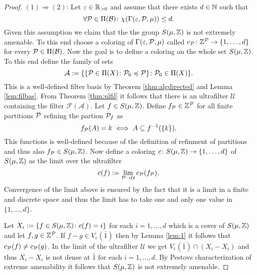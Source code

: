 \begin{proof}
  $(1) \Rightarrow (2)$: Let $\varepsilon \in \R_{>0}$ and assume that there exists $d \in \N$ such that
  \begin{equation*}
    \forall \P \in \Pi(\mathcal{B})\colon \chi(\Gamma(\varepsilon, {\P}, \mu)) \leq d. 
  \end{equation*}
  Given this assumption we claim that the the group $S(\mu, \Z)$ is not extremely amenable. To this end choose a coloring of $\Gamma(\varepsilon, \P, \mu)$ called $c_{\P}\colon \Z^{\P} \to \{1, \ldots, d\}$ for every $\P \in \Pi(\mathcal{B})$. Now the goal is to define a coloring on the whole set $S(\mu, \Z)$. To this end define the family of sets
  \begin{equation*}
    \mathcal{A} := \{\{ \P \in \Pi(X)\colon \P_0 \preccurlyeq \P\}\colon \P_0 \in \Pi(X)\}.
  \end{equation*}
  This is a well-defined filter basis by Theorem \ref{thm:algdirected} and Lemma \ref{lem:filbas}. From Theorem \ref{thm:ulfil} it follows that there is an ultrafilter $\mathcal{U}$ containing the filter $\mathcal{F}(\mathcal{A})$.
 Let $f \in S(\mu, \Z)$. Define $f_\P \in \Z^\P$ for all finite partitions $\P$ refining the partion $\P_f$ as
  \begin{equation*}
    f_\P(A) = k \iff A \subseteq f^{-1}(\{k\}). 
  \end{equation*}
  This functions is well-defined because of the definition of refinment of partitions and thus also $f_\P \in S(\mu, \Z)$.
  Now define a coloring $c\colon S(\mu, \Z) \to \{1, \ldots, d\}$ of $S(\mu, \Z)$ as the limit over the ultrafilter
  \begin{equation*}
    c(f) := \lim\limits_{\P \to \mathcal{U}} c_{\P}(f_\P).
  \end{equation*}
  Convergence of the limit above is ensured by the fact that it is a limit in a finite and discrete space and thus the limit has to take one and only one value in $\{1, \ldots, d\}$.
  
  Let $X_i := \{f \in S(\mu, \Z)\colon c(f) = i\}$ for each $i = 1, \ldots, d$ which is a cover of $S(\mu, \Z)$ and let $f, g \in \Z^\P$. If $f - g\in V_\varepsilon(\bar{1})$ then by Lemma \ref{lem:1} it follows that $c_\P(f) \neq c_\P(g)$.
  In the limit of the ultrafilter $\mathcal{U}$ we get $V_\varepsilon(\bar{1}) \cap (X_i - X_i)$ and thus $X_i - X_i$ is not dense at $\bar{1}$ for each $i = 1, \ldots, d$. By Pestovs characterization \cite[Theorem 3.4.9]{PestovDyn} of extreme amenability it follows that $S(\mu, \Z)$ is not extremely amenable. 


\end{proof}
